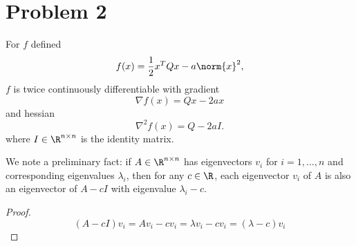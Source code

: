 \documentclass{homework}
\begin{document}
\section{Problem 2}
For $f$ defined
\begin{equation}
    f(x) = \frac{1}{2} x^TQx - a \norm{x}^2,
\end{equation}
$f$ is twice continuously differentiable with gradient
\begin{equation}
    \nabla f(x) = Qx - 2ax
\end{equation}
and hessian
\begin{equation}
    \nabla^2 f(x) = Q - 2aI.
\end{equation}
where $I\in\R^{n\times n}$ is the identity matrix.

We note a preliminary fact: if $A\in\R^{n\times n}$ has eigenvectors
$v_i$ for $i=1,\dots,n$ and corresponding eigenvalues $\lambda_i$,
then for any $c \in \R$, each eigenvector $v_i$ of $A$ is also
an eigenvector of $A - cI$ with eigenvalue $\lambda_i - c$.

\begin{proof}
    \begin{equation}
        (A - cI) v_i = Av_i - cv_i = \lambda v_i - cv_i = (\lambda - c) v_i
    \end{equation}
\end{proof}
\end{document}
